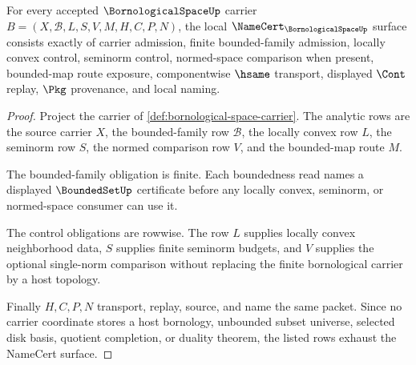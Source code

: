 \begin{theorem}
\label{thm:bornological-space-namecert-obligations}
For every accepted $\BornologicalSpaceUp$ carrier $B=(X,\mathcal{B},L,S,V,M,H,C,P,N)$, the local $\NameCert_{\BornologicalSpaceUp}$ surface consists exactly of carrier admission, finite bounded-family admission, locally convex control, seminorm control, normed-space comparison when present, bounded-map route exposure, componentwise $\hsame$ transport, displayed $\Cont$ replay, $\Pkg$ provenance, and local naming.
\end{theorem}
\begin{proof}
Project the carrier of \autoref{def:bornological-space-carrier}. The analytic rows are the source carrier $X$, the bounded-family row $\mathcal{B}$, the locally convex row $L$, the seminorm row $S$, the normed comparison row $V$, and the bounded-map route $M$.

The bounded-family obligation is finite. Each boundedness read names a displayed $\BoundedSetUp$ certificate before any locally convex, seminorm, or normed-space consumer can use it.

The control obligations are rowwise. The row $L$ supplies locally convex neighborhood data, $S$ supplies finite seminorm budgets, and $V$ supplies the optional single-norm comparison without replacing the finite bornological carrier by a host topology.

Finally $H,C,P,N$ transport, replay, source, and name the same packet. Since no carrier coordinate stores a host bornology, unbounded subset universe, selected disk basis, quotient completion, or duality theorem, the listed rows exhaust the NameCert surface.
\end{proof}

